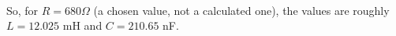 \documentclass[12pt,a4paper]{report}
\begin{document}

\ \\
So, for $R = 680 \Omega$ (a chosen value, not a calculated one), the values are roughly $L = 12.025$ mH and $C = 210.65$ nF.
\end{document}
